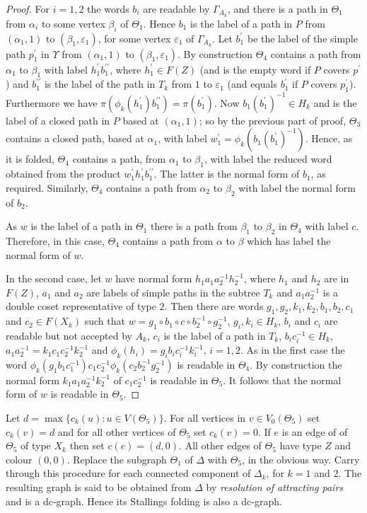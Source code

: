 \documentclass[a4paper,12pt]{article}
\renewcommand{\a}{\alpha }
\renewcommand{\b}{\beta }
\newcommand{\G}{\Gamma }
\newcommand{\D}{\Delta }
\newcommand{\e}{\varepsilon }
\newcommand{\T}{\Theta }
\newcommand{\U}{\Upsilon }
\numberwithin{equation}{section}
\numberwithin{figure}{section}
\begin{document}
\begin{proof}
For $i=1,2$ the words $b_i$ are readable by $\G_{A_k}$, and there
is a path in $\T_1$ from $\a_i$ to some vertex $\b_i$ of $\T_1$.
Hence $b_1$ is the label of a path in $P$ from $(\a_1,1)$ to
$(\b_1,\e_1)$, for some vertex $\e_1$ of $\G_{A_k}$.   Let $b_1^\prime$
 be the label of the simple path $p_1^\prime$ in $\U$ from 
$(\a_1,1)$ to $(\b_1,\e_1)$. By construction $\T_4$ contains a path
from $\a_1$ to $\b_1$ with label $h_1^\prime b_1^{\prime\prime}$, where
$h_1^\prime \in F(Z)$ (and is the empty word if $P$ covers $p^\prime$) and 
$b_1^{\prime\prime}$ is the label of the path in $T_k$ from $1$ to 
$\e_1$ (and equals $b_1^\prime$ if $P$ covers $p_1^\prime$).  
Furthermore we have 
$\pi(\phi_k(h_1^\prime)b_1^{\prime\prime})=\pi(b_1^\prime)$. 
Now $b_1(b_1^\prime)^{-1}\in H_k$ and is the label of a closed
path  in $P$ based at $(\a_1,1)$; so by the 
previous part of proof, $\T_3$ contains a closed path, based at $\a_1$, 
 with label 
$w_1^\prime=\phi_k(b_1(b_1^\prime)^{-1})$. Hence, as it is folded, 
$\T_4$ contains a path, from $\a_1$ to $\b_1$, 
with label the reduced word obtained from the product 
$w_1^{\prime} h_1^\prime b_1^{\prime\prime}$. The latter is the normal 
form of $b_1$, as required. Similarly, $\T_4$ contains a path from 
$\a_2$ to $\b_2$ with label the normal form of $b_2$. 

As $w$ is the label of a path in $\T_1$ there is a path from $\b_1$ to
$\b_2$ in $\T_4$ with label $c$. Therefore, in this case, $\T_4$ contains
a path from $\a$ to $\b$ which has label the normal form of $w$. 

In the second case, 
let $w$ have normal form $h_1 a_1 a_2^{-1} h_2^{-1} $, where 
$h_1$ and $h_2$ are in $F(Z)$,  $a_1$ and $a_2$ are labels 
of simple paths in the subtree $T_k$ and $a_1a_2^{-1}$ is a double coset
representative of type $2$. Then there are words
$g_1, g_2, k_1, k_2, b_1, b_2, c_1$ and $c_2\in F(X_k)$ such that 
$w=g_1\circ b_1\circ c \circ b_2^{-1}\circ g_2^{-1}$, 
$g_i, k_i\in H_k$, $b_i$ and $c_i$ are 
readable but not accepted by  $A_k$, $c_i$ is the label of 
a path in $T_k$, $b_ic_i^{-1}\in H_k$, $a_1a_2^{-1}=k_1c_1c_2^{-1}k_2^{-1}$
 and  
$\phi_k(h_i)=g_ib_ic_i^{-1}k_i^{-1}$, $i=1,2$. 
As in the first case the word $\phi_k(g_1b_1c_1^{-1})c_1 c_2^{-1}
\phi_k(c_2b_2^{-1}g_2^{-1})$ is readable in $\T_4$. By construction the
normal form $k_1a_1a_2^{-1}k_2^{-1}$ of $c_1 c_2^{-1}$ is readable in
$\T_5$. It follows that the normal form of $w$ is readable in $\T_5$. 
\end{proof}

Let $d=\max\{c_k(u): u\in V(\T_5)\}$.  For all vertices
in $v\in V_0(\T_5)$ set $c_k(v)=d$ and for all other vertices
of $\T_5$ set $c_k(v)=0$. If $e$ is an edge of  of $\T_5$  of 
  type $X_k$ then set $c(e)=(d,0)$.  All other edges of $\T_5$ have
type $Z$ and colour $(0,0)$.
Replace
the subgraph $\T_1$ of $\D$ with $\T_5$, in the obvious
way. Carry through this procedure for each  connected component 
of $\D_k$, for $k=1$ and $2$. The resulting graph is said to
be obtained from $\D$ by {\em resolution of attracting pairs} and 
is  a dc-graph. Hence its Stallings folding is also a dc-graph.
\end{document}
